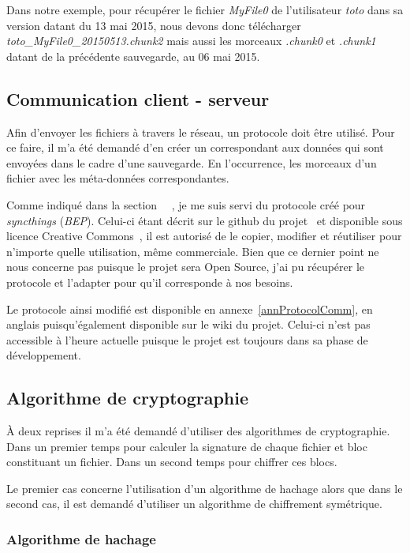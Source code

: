 \documentclass[a4paper,10pt, twoside]{report}
\begin{document}
\begin{spacing}{1.2}
Dans notre exemple, pour récupérer le fichier \textit{MyFile0} de
l'utilisateur \textit{toto}  dans sa version datant du 13 mai 2015, nous devons
donc télécharger \textit{toto\_MyFile0\_20150513.chunk2} mais aussi les
morceaux \textit{.chunk0} et \textit{.chunk1} datant de la précédente
sauvegarde, au 06 mai 2015.

\subsection{Communication client - serveur}

Afin d'envoyer les fichiers à travers le réseau, un protocole doit être
utilisé. Pour ce faire, il m'a été demandé d'en créer un correspondant
aux données qui sont envoyées dans le cadre d'une sauvegarde. En l'occurrence,
les morceaux d'un fichier avec les méta-données correspondantes.

Comme indiqué dans la section \flqq~~\frqq, je me
suis servi du protocole créé pour \textit{syncthings} (\textit{BEP}). Celui-ci
étant décrit sur le github du projet~\cite{refBEP} et disponible sous licence
Creative Commons~\cite{refCC4.0}, il est autorisé de le copier, modifier et
réutiliser pour n'importe quelle utilisation, même commerciale. Bien que ce
dernier point ne nous concerne pas puisque le projet sera Open Source, j'ai pu
récupérer le protocole et l'adapter pour qu'il corresponde à nos besoins.

Le protocole ainsi modifié est disponible en annexe~\ref{annProtocolComm}, en
anglais puisqu'également disponible sur le wiki du projet. Celui-ci n'est pas
accessible à l'heure actuelle puisque le projet est toujours dans sa phase de
développement.

\subsection{Algorithme de cryptographie}

À deux reprises il m'a été demandé d'utiliser des algorithmes de cryptographie.
Dans un premier temps pour calculer la signature de chaque fichier et bloc
constituant un fichier. Dans un second temps pour chiffrer ces blocs.

Le premier cas concerne l'utilisation d'un algorithme de hachage alors que dans
le second cas, il est demandé d'utiliser un algorithme de chiffrement
symétrique.

\subsubsection{Algorithme de hachage}


\end{spacing}
\end{document}
